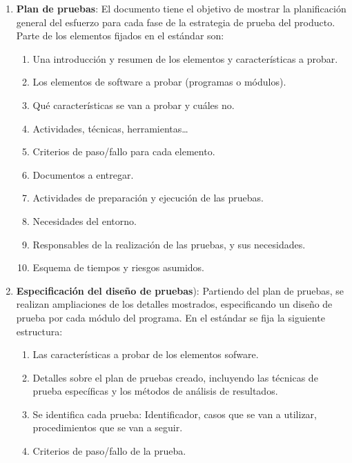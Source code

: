 \begin{enumerate}
    \item \textbf{Plan de pruebas}: El documento tiene el objetivo de mostrar la planificación general del esfuerzo para cada fase de la estrategia de prueba del producto. Parte de los elementos fijados en el estándar son:
    \begin{enumerate}
        \item Una introducción y resumen de los elementos y características a probar.
        \item Los elementos de software a probar (programas o módulos).
        \item Qué características se van a probar y cuáles no.
        \item Actividades, técnicas, herramientas\ldots
        \item Criterios de paso/fallo para cada elemento.
        \item Documentos a entregar.
        \item Actividades de preparación y ejecución de las pruebas.
        \item Necesidades del entorno.
        \item Responsables de la realización de las pruebas, y sus necesidades.
        \item Esquema de tiempos y riesgos asumidos.
    \end{enumerate}

    \item \textbf{Especificación del diseño de pruebas}): Partiendo del plan de pruebas, se realizan ampliaciones de los detalles mostrados, especificando un diseño de prueba por cada módulo del programa. En el estándar se fija la siguiente estructura:
    \begin{enumerate}
        \item Las características a probar de los elementos sofware.
        \item Detalles sobre el plan de pruebas creado, incluyendo las técnicas de prueba específicas y los métodos de análisis de resultados.
        \item Se identifica cada prueba: Identificador, casos que se van a utilizar, procedimientos que se van a seguir.
        \item Criterios de paso/fallo de la prueba.
    \end{enumerate}


\end{enumerate}

